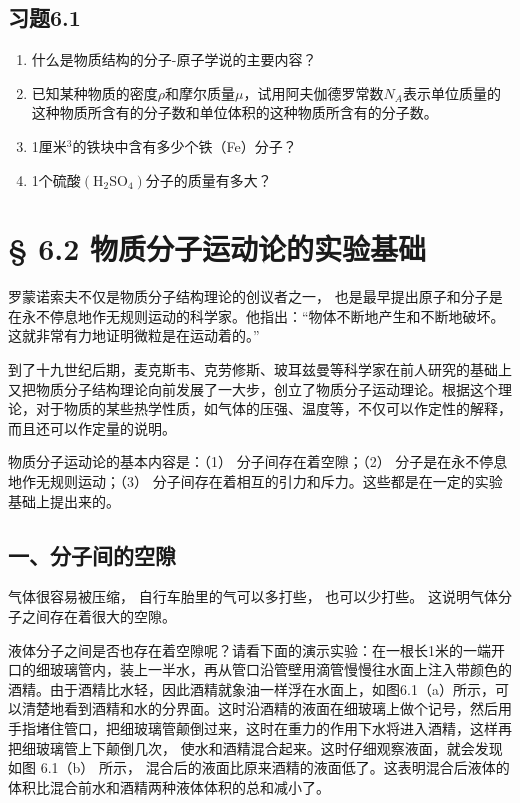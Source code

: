 \subsection{习题6.1}\label{ux4e60ux98986.1}

\begin{enumerate}
\def\labelenumi{\arabic{enumi}.}
\item
  什么是物质结构的分子-原子学说的主要内容？
\item
  已知某种物质的密度\(\rho\)和摩尔质量\(\mu\)，试用阿夫伽德罗常数\(N_{A}\)表示单位质量的这种物质所含有的分子数和单位体积的这种物质所含有的分子数。
\item
  1厘米\(^{3}\)的铁块中含有多少个铁（Fe）分子？
\item
  1个硫酸\(\left(\mathrm{H}_{2}\mathrm{SO}_{4}\right)\)分子的质量有多大？
\end{enumerate}

\section{§ 6.2
物质分子运动论的实验基础}\label{ux7269ux8d28ux5206ux5b50ux8fd0ux52a8ux8bbaux7684ux5b9eux9a8cux57faux7840}

罗蒙诺索夫不仅是物质分子结构理论的创议者之一，
也是最早提出原子和分子是在永不停息地作无规则运动的科学家。他指出：``物体不断地产生和不断地破坏。这就非常有力地证明微粒是在运动着的。''

到了十九世纪后期，麦克斯韦、克劳修斯、玻耳兹曼等科学家在前人研究的基础上又把物质分子结构理论向前发展了一大步，创立了物质分子运动理论。根据这个理论，对于物质的某些热学性质，如气体的压强、温度等，不仅可以作定性的解释，而且还可以作定量的说明。

物质分子运动论的基本内容是：（1） 分子间存在着空隙；（2）
分子是在永不停息地作无规则运动；（3）
分子间存在着相互的引力和斥力。这些都是在一定的实验基础上提出来的。

\subsection{一、分子间的空隙}\label{ux4e00ux5206ux5b50ux95f4ux7684ux7a7aux9699}

气体很容易被压缩， 自行车胎里的气可以多打些， 也可以少打些。
这说明气体分子之间存在着很大的空隙。

液体分子之间是否也存在着空隙呢？请看下面的演示实验：在一根长1米的一端开口的细玻璃管内，装上一半水，再从管口沿管壁用滴管慢慢往水面上注入带颜色的酒精。由于酒精比水轻，因此酒精就象油一样浮在水面上，如图6.1（a）所示，可以清楚地看到酒精和水的分界面。这时沿酒精的液面在细玻璃上做个记号，然后用手指堵住管口，把细玻璃管颠倒过来，这时在重力的作用下水将进入酒精，这样再把细玻璃管上下颠倒几次，
使水和酒精混合起来。这时仔细观察液面，就会发现如图 6.1（b） 所示，
混合后的液面比原来酒精的液面低了。这表明混合后液体的体积比混合前水和酒精两种液体体积的总和减小了。

